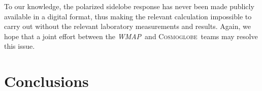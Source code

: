\documentclass[twocolumn]{../../common/aa}
\def\WMAP{\emph{WMAP}}
\newcommand{\cosmoglobe}{\textsc{Cosmoglobe}}
\begin{document}
To our knowledge, the polarized sidelobe response has  never been made publicly available in a digital format, thus making the relevant calculation impossible to carry out without the relevant laboratory measurements and results. Again, we hope that a joint effort between the \WMAP\ and \cosmoglobe\ teams may resolve this issue. 




\section{Conclusions}
\label{sec:conclusions}
\end{document}
